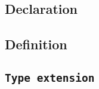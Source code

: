 \def\Subsection#1{\subsection{#1}}

\Subsection{Declaration}

\Subsection{Definition}

\subsection{\tt{Type} extension}

